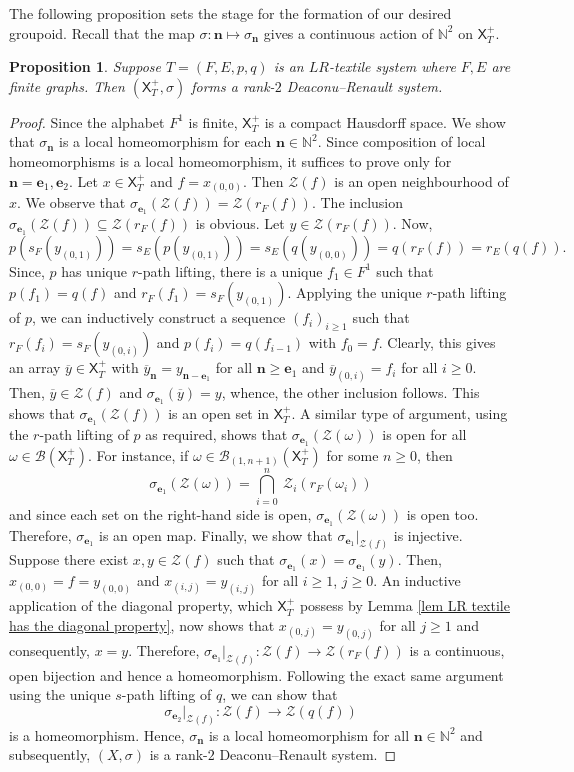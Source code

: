 \documentclass[a4paper,reqno,12pt]{amsart}
\newcommand{\Zz}{\mathcal{Z}}
\newcommand{\Xs}{\mathsf{X}}
\newcommand{\ea}{\mathbf{e}_1}
\newcommand{\eb}{\mathbf{e}_2}
\newtheorem{prop}[thm]{Proposition}
\theoremstyle{definition}
\theoremstyle{remark}
\begin{document}
The following proposition sets the stage for the formation of our desired groupoid. Recall that the map $\sigma:\mathbf{n}\longmapsto \sigma_\mathbf{n}$ gives a continuous action of $\mathbb{N}^2$ on $\mathsf{X}_T^+$. 
\begin{prop}\label{pro the LR-property gives a DR system}
Suppose $T=(F,E,p,q)$ is an $LR$-textile system where $F,E$ are finite graphs. Then $(\mathsf{X}_T^+,\sigma)$ forms a rank-$2$ Deaconu--Renault system.     
\end{prop}
\begin{proof}
Since the alphabet $F^1$ is finite, $\Xs_T^+$ is a compact Hausdorff space. We show that $\sigma_\mathbf{n}$ is a local homeomorphism for each $\mathbf{n}\in \mathbb{N}^2$. Since composition of local homeomorphisms is a local homeomorphism, it suffices to prove only for $\mathbf{n}=\ea,\eb$. Let $x\in \Xs_T^+$ and $f=x_{(0,0)}$. Then $\Zz(f)$ is an open neighbourhood of $x$. We observe that $\sigma_{\ea}(\Zz(f))=\Zz(r_F(f))$. The inclusion $\sigma_{\ea}(\Zz(f)) \subseteq \Zz(r_F(f))$ is obvious. Let $y\in \Zz(r_F(f))$. Now, \[p(s_F(y_{(0,1)}))=s_E(p(y_{(0,1)}))=s_E(q(y_{(0,0)}))=q(r_F(f))=r_E(q(f)).\] Since, $p$ has unique $r$-path lifting, there is a unique $f_1\in F^1$ such that $p(f_1)=q(f)$ and $r_F(f_1)=s_F(y_{(0,1)})$. Applying the unique $r$-path lifting of $p$, we can inductively construct a sequence $(f_i)_{i\ge 1}$ such that $r_F(f_i)=s_F(y_{(0,i)})$ and $p(f_i)=q(f_{i-1})$ with $f_0=f$. Clearly, this gives an array $\overline{y}\in \Xs_T^+$ with $\overline{y}_\mathbf{n}=y_{\mathbf{n}-\ea}$ for all $\mathbf{n}\ge \ea$ and $\overline{y}_{(0,i)}=f_i$ for all $i\ge 0$. Then, $\overline{y}\in \Zz(f)$ and $\sigma_{\ea}(\overline{y})=y$, whence, the other inclusion follows. This shows that $\sigma_{\ea}(\Zz(f))$ is an open set in $\Xs_T^+$. A similar type of argument, using the $r$-path lifting of $p$ as required, shows that $\sigma_{\ea}(\Zz(\omega))$ is open for all $\omega\in \mathcal{B}(\Xs_T^+)$. For instance, if $\omega\in \mathcal{B}_{(1,n+1)}(\Xs_T^+)$ for some $n\ge 0$, then \[\sigma_{\ea}(\Zz(\omega))=\displaystyle{\bigcap_{i=0}^{n}}~\Zz_i(r_F(\omega_i))\] and since each set on the right-hand side is open, $\sigma_{\ea}(\Zz(\omega))$ is open too. Therefore, $\sigma_{\ea}$ is an open map. Finally, we show that $\sigma_{\ea}|_{\Zz(f)}$ is injective. Suppose there exist $x,y\in \Zz(f)$ such that $\sigma_{\ea}(x)=\sigma_{\ea}(y)$. Then, $x_{(0,0)}=f=y_{(0,0)}$ and $x_{(i,j)}=y_{(i,j)}$ for all $i\ge 1$, $j\ge 0$. An inductive application of the diagonal property, which $\Xs_T^+$ possess by Lemma \ref{lem LR textile has the diagonal property}, now shows that $x_{(0,j)}=y_{(0,j)}$ for all $j\ge 1$ and consequently, $x=y$. Therefore, $\sigma_{\ea}|_{\Zz(f)}:\Zz(f)\longrightarrow \Zz(r_F(f))$ is a continuous, open bijection and hence a homeomorphism. Following the exact same argument using the unique $s$-path lifting of $q$, we can show that \[\sigma_{\eb}|_{\Zz(f)}:\Zz(f)\longrightarrow \Zz(q(f))\] is a homeomorphism. Hence, $\sigma_\mathbf{n}$ is a local homeomorphism for all $\mathbf{n}\in \mathbb{N}^2$ and subsequently, $(X,\sigma)$ is a rank-$2$ Deaconu--Renault system. 
\end{proof}
\end{document}
